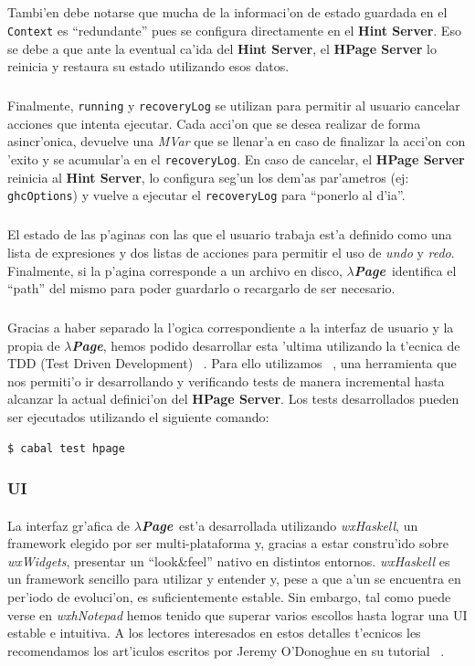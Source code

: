 \documentclass[a4paper]{article}
\newcommand{\hpage}{\textbf{\textsl{$\lambda$Page}}}
\begin{document}
\subparagraph{}Tambi'en debe notarse que mucha de la informaci'on de estado guardada en el \texttt{Context} es ``redundante'' pues se configura directamente en el \textbf{Hint Server}.  Eso se debe a que ante la eventual ca'ida del \textbf{Hint Server}, el \textbf{HPage Server} lo reinicia y restaura su estado utilizando esos datos.
\subparagraph{}Finalmente, \texttt{running} y \texttt{recoveryLog} se utilizan para permitir al usuario cancelar acciones que intenta ejecutar.  Cada acci'on que se desea realizar de forma asincr'onica, devuelve una \textsl{MVar} que se llenar'a en caso de finalizar la acci'on con 'exito y se acumular'a en el \texttt{recoveryLog}.  En caso de cancelar, el \textbf{HPage Server} reinicia al \textbf{Hint Server}, lo configura seg'un los dem'as par'ametros (ej: \texttt{ghcOptions}) y vuelve a ejecutar el \texttt{recoveryLog} para ``ponerlo al d'ia''.
\subparagraph{}El estado de las p'aginas con las que el usuario trabaja est'a definido como una lista de expresiones y dos listas de acciones para permitir el uso de \textsl{undo} y \textsl{redo}.  Finalmente, si la p'agina corresponde a un archivo en disco, \hpage\ identifica el ``path'' del mismo para poder guardarlo o recargarlo de ser necesario.
\subparagraph{}Gracias a haber separado la l'ogica correspondiente a la interfaz de usuario y la propia de \hpage, hemos podido desarrollar esta 'ultima utilizando la t'ecnica de TDD (Test Driven Development) ~\cite{tdd}.  Para ello utilizamos ~\cite{quickcheck}, una herramienta que nos permiti'o ir desarrollando y verificando tests de manera incremental hasta alcanzar la actual definici'on del \textbf{HPage Server}.  Los tests desarrollados pueden ser ejecutados utilizando el siguiente comando:
\lstset{language=sh, frame=single, tabsize=2}
\begin{lstlisting}
$ cabal test hpage
\end{lstlisting}
\lstset{language=haskell, frame=single, tabsize=4}

\subsubsection{UI}
\paragraph{}La interfaz gr'afica de \hpage\ est'a desarrollada utilizando \textsl{wxHaskell}, un framework elegido por ser multi-plataforma y, gracias a estar constru'ido sobre \textsl{wxWidgets}, presentar un ``look\&feel'' nativo en distintos entornos.  \textsl{wxHaskell} es un framework sencillo para utilizar y entender y, pese a que a'un se encuentra en per'iodo de evoluci'on, es suficientemente estable.  Sin embargo, tal como puede verse en \textsl{wxhNotepad} hemos tenido que superar varios escollos hasta lograr una UI estable e intuitiva.  A los lectores interesados en estos detalles t'ecnicos les recomendamos los art'iculos escritos por Jeremy O'Donoghue en su tutorial ~\cite{wewantarock}.
\end{document}
